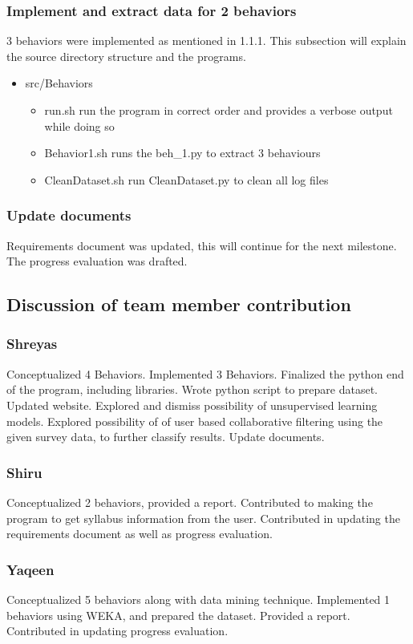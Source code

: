 \documentclass[12pt]{article}
\begin{document}
		\subsubsection{Implement and extract data for 2 behaviors}
		3 behaviors were implemented as mentioned in 1.1.1. This subsection will explain the source directory structure and the programs.
		\begin{itemize}
			\item src/Behaviors
			\begin{itemize}
				\item run.sh run the program in correct order and provides a verbose output while doing so
				\item Behavior1.sh runs the beh\_1.py to extract 3 behaviours
				\item CleanDataset.sh run CleanDataset.py to clean all log files
			\end{itemize}
		\end{itemize}
		\subsubsection{Update documents}
		Requirements document was updated, this will continue for the next milestone. The progress evaluation was drafted.
		
	\subsection{Discussion of team member contribution}
	\subsubsection{Shreyas}
		Conceptualized 4 Behaviors. Implemented 3 Behaviors. Finalized the python end of the program, including libraries. Wrote python script to prepare dataset. Updated website. Explored and dismiss possibility of unsupervised learning models. Explored possibility of of user based collaborative filtering using the given survey data, to further classify results. Update documents.
	\subsubsection{Shiru}
	Conceptualized 2 behaviors, provided a report. Contributed to making the program to get syllabus information from the user. Contributed in updating the requirements document as well as progress evaluation.
	\subsubsection{Yaqeen}
	Conceptualized 5 behaviors along with data mining technique. Implemented 1 behaviors using WEKA, and prepared the dataset. Provided a report. Contributed in updating progress evaluation.
\end{document}
